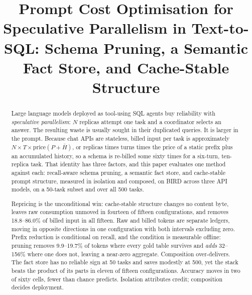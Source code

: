 \documentclass[conference]{IEEEtran}
\begin{document}
\title{Prompt Cost Optimisation for Speculative Parallelism in Text-to-SQL:
Schema Pruning, a Semantic Fact Store, and Cache-Stable Structure}

\author{
}

\maketitle

\begin{abstract}
Large language models deployed as tool-using SQL agents buy reliability with
\emph{speculative parallelism}: $N$ replicas attempt one task and a coordinator
selects an answer. The resulting waste is usually sought in their duplicated
queries. It is larger in the prompt. Because chat APIs are stateless, billed
input per task is approximately $N \times T \times \mathrm{price}(P + \bar{H})$,
or replicas times turns times the price of a static prefix plus an accumulated
history, so a schema is re-billed some sixty times for a six-turn, ten-replica
task. That identity has three factors, and this paper
evaluates one method against each: recall-aware schema pruning, a semantic fact
store, and cache-stable prompt structure, measured in isolation and composed,
on BIRD across three API models, on a 50-task subset and over all 500 tasks.

Repricing is the unconditional win: cache-stable structure changes no content
byte, leaves raw consumption unmoved in fourteen of fifteen configurations, and
removes 18.8--86.0\% of billed input in all fifteen. Raw and billed tokens are
separate ledgers, moving in opposite directions in one configuration with both
intervals excluding zero. Prefix reduction is conditional on recall, and
the condition is measurable offline: pruning removes 9.9--19.7\% of tokens where
every gold table survives and \emph{adds} 32--156\% where one does not, leaving
a near-zero aggregate. Composition over-delivers. The fact store has no
reliable sign at 50 tasks and saves modestly at 500, yet the stack beats the
product of its parts in eleven of fifteen configurations. Accuracy moves in two
of sixty cells, fewer than chance predicts. Isolation attributes credit;
composition decides deployment.
\end{abstract}
\end{document}
